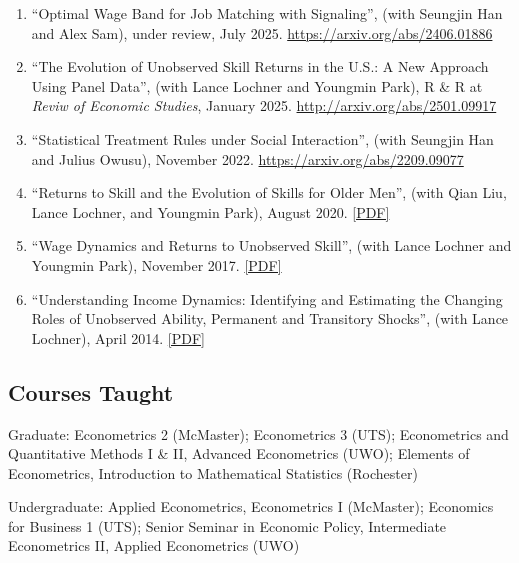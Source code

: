 \documentclass[12pt]{article}
\begin{document}
\begin{enumerate}[resume]
\item ``Optimal Wage Band for Job Matching with Signaling'', (with Seungjin Han and Alex Sam), under review, July 2025. \url{https://arxiv.org/abs/2406.01886}
\item ``The Evolution of Unobserved Skill Returns in the U.S.: A New Approach Using Panel Data'', (with Lance Lochner and Youngmin Park), R \& R at \textit{Reviw of Economic Studies}, January 2025. \url{http://arxiv.org/abs/2501.09917}
\item ``Statistical Treatment Rules under Social Interaction'', (with Seungjin Han and Julius Owusu), November 2022. \url{https://arxiv.org/abs/2209.09077} 
\item ``Returns to Skill and the Evolution of Skills for Older Men'', (with Qian Liu, Lance Lochner, and Youngmin Park), August 2020. \href{https://youngkishin.com/assets/pdf/LLPS_ID_2020.pdf}{[PDF]}
\item ``Wage Dynamics and Returns to Unobserved Skill'', (with Lance Lochner and Youngmin Park), November 2017. \href{https://youngkishin.com/assets/pdf/LPS_ID_2017.pdf}{[PDF]}
\item ``Understanding Income Dynamics: Identifying and Estimating the Changing Roles of Unobserved Ability, Permanent and Transitory Shocks'', (with Lance Lochner), April 2014. \href{https://youngkishin.com/assets/pdf/LS_ID_2014.pdf}{[PDF]}
\end{enumerate}




\subsection*{Courses Taught}

\begin{description}
\item \hspace{0.2in}Graduate: Econometrics 2 (McMaster); Econometrics 3 (UTS); Econometrics and Quantitative Methods I \& II,
Advanced Econometrics (UWO); Elements of Econometrics,
Introduction to Mathematical Statistics (Rochester)

\item \hspace{0.2in}Undergraduate: Applied Econometrics, Econometrics I (McMaster); Economics for Business 1 (UTS); Senior Seminar in Economic Policy, Intermediate Econometrics II, Applied Econometrics (UWO)
\end{description}
\end{document}

